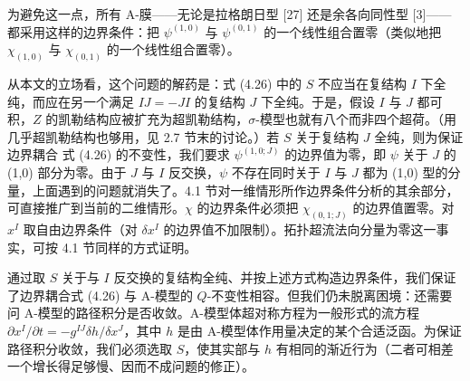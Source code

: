 \documentclass[11pt,a4paper,UTF8]{ctexart}
\theoremstyle{plain}
\theoremstyle{definition}
\begin{document}
为避免这一点，所有 A-膜——无论是拉格朗日型 [27] 还是余各向同性型 [3]——都采用这样的边界条件：把 $\psi^{(1,0)}$ 与 $\psi^{(0,1)}$ 的一个线性组合置零（类似地把 $\chi_{(1,0)}$ 与 $\chi_{(0,1)}$ 的一个线性组合置零）。

从本文的立场看，这个问题的解药是：式 (4.26) 中的 $S$ 不应当在复结构 $I$ 下全纯，而应在另一个满足 $IJ=-JI$ 的复结构 $J$ 下全纯。于是，假设 $I$ 与 $J$ 都可积，$Z$ 的凯勒结构应被扩充为超凯勒结构，$\sigma$-模型也就有八个而非四个超荷。（用几乎超凯勒结构也够用，见 2.7 节末的讨论。）若 $S$ 关于复结构 $J$ 全纯，则为保证边界耦合 式 (4.26) 的不变性，我们要求 $\psi^{(1,0;J)}$ 的边界值为零，即 $\psi$ 关于 $J$ 的 (1,0) 部分为零。由于 $J$ 与 $I$ 反交换，$\psi$ 不存在同时关于 $I$ 与 $J$ 都为 (1,0) 型的分量，上面遇到的问题就消失了。4.1 节对一维情形所作边界条件分析的其余部分，可直接推广到当前的二维情形。$\chi$ 的边界条件必须把 $\chi_{(0,1;J)}$ 的边界值置零。对 $x^I$ 取自由边界条件（对 $\delta x^I$ 的边界值不加限制）。拓扑超流法向分量为零这一事实，可按 4.1 节同样的方式证明。


通过取 $S$ 关于与 $I$ 反交换的复结构全纯、并按上述方式构造边界条件，我们保证了边界耦合式 (4.26) 与 A-模型的 $Q$-不变性相容。但我们仍未脱离困境：还需要问 A-模型的路径积分是否收敛。A-模型体超对称方程为一般形式的流方程 $\partial x^I/\partial t=-g^{IJ}\delta h/\delta x^J$，其中 $h$ 是由 A-模型体作用量决定的某个合适泛函。为保证路径积分收敛，我们必须选取 $S$，使其实部与 $h$ 有相同的渐近行为（二者可相差一个增长得足够慢、因而不成问题的修正）。

\end{document}
